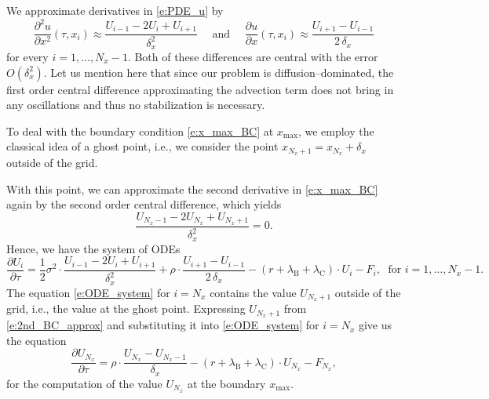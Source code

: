 \documentclass[a4paper,10pt]{article}
\newcommand{\1}{\mathbf{1}}
\begin{document}
We approximate derivatives in \eqref{e:PDE_u} by
\begin{equation}
\frac{\partial^{2} u}{\partial x^{2}}(\tau,x_{i}) \approx \frac{U_{i-1}-2 U_{i} + U_{i+1}}{\delta_x^2} \quad \text{ and }\quad \frac{\partial u}{\partial x}(\tau,x_{i}) \approx \frac{U_{i+1} - U_{i-1}}{2\, \delta_x}
\end{equation}
for every $i=1,\ldots, N_x-1$. Both of these differences are central with the error $O(\delta_x^2)$. Let us mention here that since our problem is diffusion--dominated, the first order central difference approximating the advection term does not bring in any oscillations and thus no stabilization is necessary.

To deal with the boundary condition \eqref{e:x_max_BC} at $x_{\max}$, we employ the classical idea of a ghost point, i.e., we consider the point $x_{N_x+1} = x_{N_x} + \delta_x$ outside of the grid. {With this point, we can approximate the second derivative in \eqref{e:x_max_BC} again by the second order central difference, which yields
\begin{equation}\label{e:2nd_BC_approx}
\frac{U_{N_x-1}-2 U_{N_x} + U_{N_x+1}}{\delta_x^2} = 0.
\end{equation} 
Hence, we have the system of ODEs
\begin{equation}\label{e:ODE_system}
\frac{\partial U_{i}}{\partial \tau} = \frac{1}{2}\sigma^{2}\cdot\frac{U_{i-1}-2 U_{i} + U_{i+1}}{\delta_x^2} +\rho\cdot \frac{U_{i+1} - U_{i-1}}{2\, \delta_x}  -(r+\lambda_\text{B}+\lambda_\text{C})\cdot U_{i}-F_{i},\; \text{ for } i=1,\ldots,N_x-1.
\end{equation}
The equation \eqref{e:ODE_system} for $i=N_x$ contains the value $U_{N_x+1}$ outside of the grid, i.e., the value at the ghost point. Expressing $U_{N_x+1}$ from \eqref{e:2nd_BC_approx} and substituting it into \eqref{e:ODE_system} for $i=N_x$ give us the equation
\begin{equation}\label{e:x_max_ODE}
\frac{\partial U_{N_x}}{\partial \tau} = \rho\cdot \frac{U_{N_x} - U_{N_x-1}}{\delta_x}  -(r+\lambda_\text{B}+\lambda_\text{C})\cdot U_{N_x}-F_{N_x},
\end{equation}
for the computation of the value $U_{N_x}$ at the boundary $x_{\max}$.

}
\end{document}
